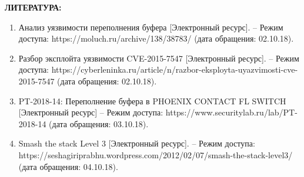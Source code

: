 \begin{center}
\textbf{ЛИТЕРАТУРА:}
\end{center}
    
\begin{enumerate}
\item Анализ уязвимости переполнения буфера [Электронный ресурс]. –  Режим доступа: https://moluch.ru/archive/138/38783/ (дата обращения: 02.10.18).
\item Разбор эксплойта уязвимости CVE-2015-7547 [Электронный ресурс]. – Режим доступа: https://cyberleninka.ru/article/n/razbor-eksployta-uyazvimosti-cve-2015-7547 (дата обращения: 02.10.18).
\item PT-2018-14: Переполнение буфера в PHOENIX CONTACT FL SWITCH [Электронный ресурс] – Режим доступа: https://www.securitylab.ru/lab/PT-2018-14 (дата обращения: 03.10.18).
\item Smash the stack Level 3 [Электронный ресурс]. – Режим доступа:\\ https://seshagiriprabhu.wordpress.com/2012/02/07/smash-the-stack-level3/ (дата обращения: 04.10.18).
\end{enumerate}
\clearpage